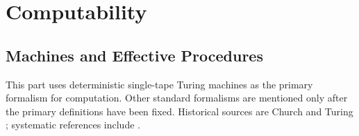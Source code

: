 \part{Computability}
\label{part:computability}

\chapter{Machines and Effective Procedures}
\label{ch:turing-machines}

This part uses deterministic single-tape Turing machines as the primary
formalism for computation.  Other standard formalisms are mentioned only
after the primary definitions have been fixed.  Historical sources are Church and Turing
\cite{Church1936,Turing1937}; systematic references include
\cite{Shoenfield1967,BoolosBurgessJeffrey2007}.

